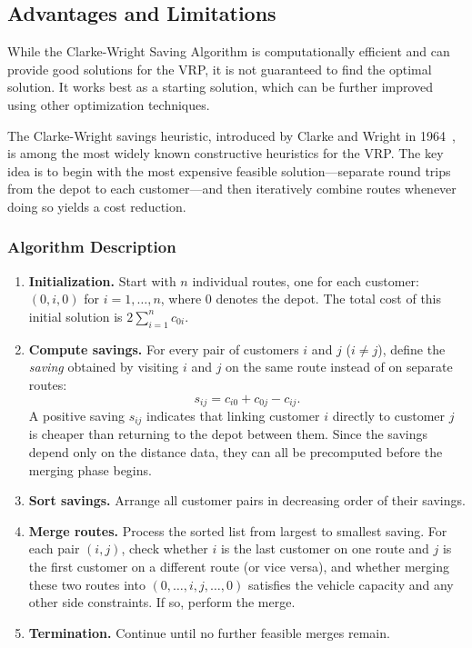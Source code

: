 \subsection{Advantages and Limitations}

While the Clarke-Wright Saving Algorithm is computationally efficient and can provide good solutions for the VRP, it is not guaranteed to find the optimal solution. It works best as a starting solution, which can be further improved using other optimization techniques.

The Clarke-Wright savings heuristic, introduced by Clarke and Wright in 1964~\cite{clarke1964scheduling}, is among the most widely known constructive heuristics for the VRP.  The key idea is to begin with the most expensive feasible solution---separate round trips from the depot to each customer---and then iteratively combine routes whenever doing so yields a cost reduction.

\subsubsection{Algorithm Description}

\begin{enumerate}
\item \textbf{Initialization.}  Start with $n$ individual routes, one for each customer: $(0, i, 0)$ for $i = 1, \ldots, n$, where $0$ denotes the depot.  The total cost of this initial solution is $2\sum_{i=1}^n c_{0i}$.

\item \textbf{Compute savings.}  For every pair of customers $i$ and $j$ ($i \neq j$), define the \emph{saving} obtained by visiting $i$ and $j$ on the same route instead of on separate routes:
\[
s_{ij} = c_{i0} + c_{0j} - c_{ij}.
\]
A positive saving $s_{ij}$ indicates that linking customer $i$ directly to customer $j$ is cheaper than returning to the depot between them.  Since the savings depend only on the distance data, they can all be precomputed before the merging phase begins.

\item \textbf{Sort savings.}  Arrange all customer pairs in decreasing order of their savings.

\item \textbf{Merge routes.}  Process the sorted list from largest to smallest saving.  For each pair $(i, j)$, check whether $i$ is the last customer on one route and $j$ is the first customer on a different route (or vice versa), and whether merging these two routes into $(0, \ldots, i, j, \ldots, 0)$ satisfies the vehicle capacity and any other side constraints.  If so, perform the merge.

\item \textbf{Termination.}  Continue until no further feasible merges remain.
\end{enumerate}

